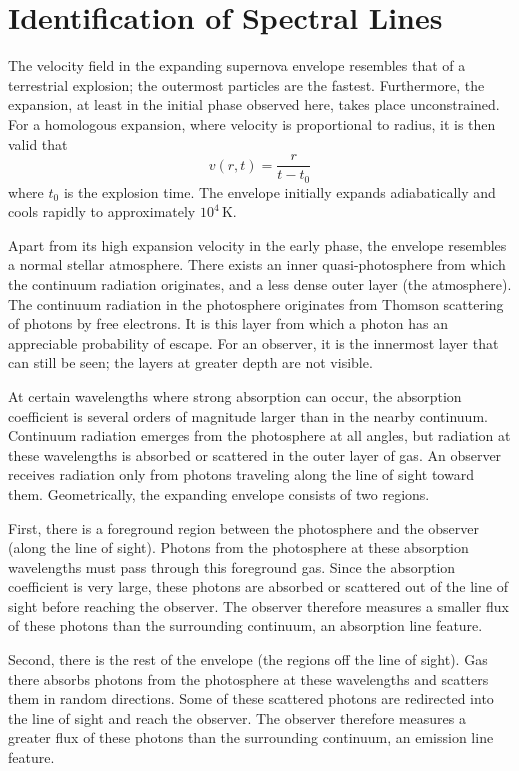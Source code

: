 \documentclass{article}
\begin{document}
\section{Identification of Spectral Lines}
The velocity field in the expanding supernova envelope resembles that of a terrestrial explosion; the outermost particles are the fastest.
Furthermore, the expansion, at least in the initial phase observed here, takes place unconstrained.
For a homologous expansion, where velocity is proportional to radius, it is then valid that
\begin{equation}
    v(r,t) = \frac{r}{t-t_0}
\end{equation}
where $t_0$ is the explosion time.
The envelope initially expands adiabatically and cools rapidly to approximately $10^4$\,K.

Apart from its high expansion velocity in the early phase, the envelope resembles a normal stellar atmosphere.
There exists an inner quasi-photosphere from which the continuum radiation originates, and a less dense outer layer (the atmosphere).
The continuum radiation in the photosphere originates from Thomson scattering of photons by free electrons.
It is this layer from which a photon has an appreciable probability of escape.
For an observer, it is the innermost layer that can still be seen; the layers at greater depth are not visible.

At certain wavelengths where strong absorption can occur, the absorption coefficient is several orders of magnitude larger than in the nearby continuum. 
Continuum radiation emerges from the photosphere at all angles, but radiation at these wavelengths is absorbed or scattered in the outer layer of gas.
An observer receives radiation only from photons traveling along the line of sight toward them.
Geometrically, the expanding envelope consists of two regions. 

First, there is a foreground region between the photosphere and the observer (along the line of sight). 
Photons from the photosphere at these absorption wavelengths must pass through this foreground gas. 
Since the absorption coefficient is very large, these photons are absorbed or scattered out of the line of sight before reaching the observer. 
The observer therefore measures a smaller flux of these photons than the surrounding continuum, an absorption line feature.

Second, there is the rest of the envelope (the regions off the line of sight).
Gas there absorbs photons from the photosphere at these wavelengths and scatters them in random directions.
Some of these scattered photons are redirected into the line of sight and reach the observer.
The observer therefore measures a greater flux of these photons than the surrounding continuum, an emission line feature.
\end{document}
